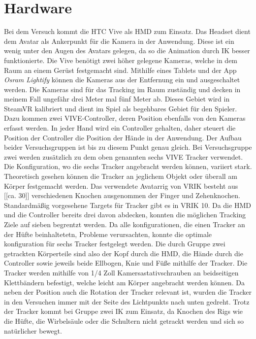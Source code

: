 \section{Hardware}
Bei dem Versuch kommt die HTC Vive als HMD zum Einsatz. Das Headset dient dem Avatar als Ankerpunkt für die Kamera in der Anwendung. Diese ist ein wenig unter den Augen des Avatars gelegen, da so die Animation durch IK besser funktionierte. Die Vive benötigt zwei höher gelegene Kameras, welche in dem Raum an einem Gerüst festgemacht sind. Mithilfe eines Tablets und der App \textit{Osram Lightify} können die Kameras aus der Entfernung ein und ausgeschaltet werden. Die Kameras sind für das Tracking im Raum zuständig und decken in meinem Fall ungefähr drei Meter mal fünf Meter ab. Dieses Gebiet wird in SteamVR kalibriert und dient im Spiel als begehbares Gebiet für den Spieler.
Dazu kommen zwei VIVE-Controller, deren Position ebenfalls von den Kameras erfasst werden. In jeder Hand wird ein Controller gehalten, daher steuert die Position der Controller die Position der Hände in der Anwendung.  Der Aufbau beider Versuchsgruppen ist bis zu diesem Punkt genau gleich.
Bei Versuchsgruppe zwei werden zusätzlich zu dem oben genannten sechs VIVE Tracker verwendet. Die Konfiguration, wo die sechs Tracker angebracht werden können, variiert stark. Theoretisch gesehen können die Tracker an jeglichem Objekt oder überall am Körper festgemacht werden. Das verwendete Avatarrig von VRIK besteht aus [[ca. 30]] verschiedenen Knochen ausgenommen der Finger und Zehenknochen. Standardmäßig vorgesehene Targets für Tracker gibt es in VRIK 10. Da die HMD und die Controller bereits drei davon abdecken, konnten die möglichen Tracking Ziele auf sieben begrentzt werden. Da alle konfigurationen, die einen Tracker an der Hüfte beinhaltetetn, Probleme verursachten, konnte die optimale konfiguration für sechs Tracker festgelegt werden. Die durch Gruppe zwei getrackten Körperteile sind also der Kopf durch die HMD, die Hände durch die Controller sowie jeweils beide Ellbogen, Knie und Füße mithilfe der Tracker. 
Die Tracker werden mithilfe von 1/4 Zoll Kamersastativschrauben an beidseitigen Klettbändern befestigt, welche leicht am Körper angebracht werden können. Da neben der Position auch die Rotation der Tracker relevant ist, wurden die Tracker in den Versuchen immer mit der Seite des Lichtpunkts nach unten gedreht.
Trotz der Tracker kommt bei Gruppe zwei IK zum Einsatz, da Knochen des Rigs wie die Hüfte, die Wirbelsäule oder die Schultern nicht getrackt werden und sich so natürlicher bewegt.

